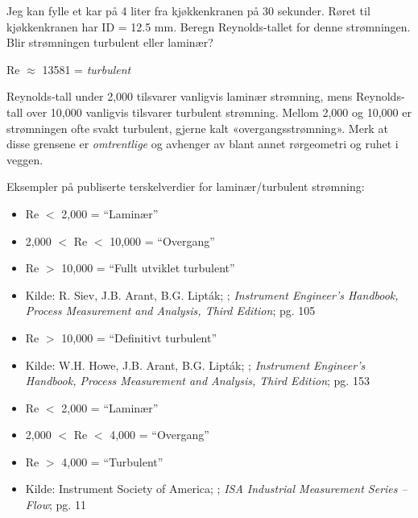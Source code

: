 
Jeg kan fylle et kar på 4 liter fra kjøkkenkranen på 30 sekunder. Røret til kjøkkenkranen har ID = 12.5 mm. Beregn Reynolds-tallet for denne strømningen. Blir strømningen turbulent eller laminær?







Re $\approx$ 13581 = {\it turbulent}

\vskip 10pt

Reynolds-tall under 2,000 tilsvarer vanligvis laminær strømning, mens Reynolds-tall over 10,000 vanligvis tilsvarer turbulent strømning. Mellom 2,000 og 10,000 er strømningen ofte svakt turbulent, gjerne kalt «overgangsstrømning». Merk at disse grensene er {\it omtrentlige} og avhenger av blant annet rørgeometri og ruhet i veggen.

Eksempler på publiserte terskelverdier for laminær/turbulent strømning:

\begin{itemize}
\goodbreak
\item{} Re $<$ 2,000 = ``Laminær''
\item{} 2,000 $<$ Re $<$ 10,000 = ``Overgang''
\item{} Re $>$ 10,000 = ``Fullt utviklet turbulent''
\item{} Kilde: R. Siev, J.B. Arant, B.G. Lipt\'ak; ; {\it Instrument Engineer's Handbook, Process Measurement and Analysis, Third Edition}; pg. 105
\end{itemize}

\begin{itemize}
\goodbreak
\item{} Re $>$ 10,000 = ``Definitivt turbulent''
\item{} Kilde: W.H. Howe, J.B. Arant, B.G. Lipt\'ak; ; {\it Instrument Engineer's Handbook, Process Measurement and Analysis, Third Edition}; pg. 153
\end{itemize}

\begin{itemize}
\goodbreak
\item{} Re $<$ 2,000 = ``Laminær''
\item{} 2,000 $<$ Re $<$ 4,000 = ``Overgang''
\item{} Re $>$ 4,000 = ``Turbulent''
\item{} Kilde: Instrument Society of America; ; {\it ISA Industrial Measurement Series -- Flow}; pg. 11
\end{itemize}

